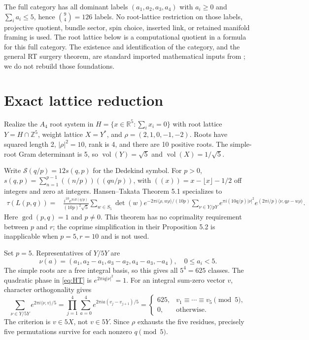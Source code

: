 \documentclass[11pt]{article}
\newcommand{\Z}{\mathbb Z}
\newcommand{\R}{\mathbb R}
\begin{document}
The full category has all dominant labels $(a_1,a_2,a_3,a_4)$ with
$a_i\geq0$ and $\sum_i a_i\leq5$, hence $\binom94=126$ labels. No
root-lattice restriction on those labels, projective quotient, bundle
sector, spin choice, inserted link, or retained manifold framing is used.
The root lattice below is a computational quotient in a formula for
this full category. The existence and identification of the category,
and the general RT surgery theorem, are standard imported mathematical
inputs from \cite{HT}; we do not rebuild those foundations.

\section{Exact lattice reduction}
Realize the $A_4$ root system in $H=\{x\in\R^5:\sum_i x_i=0\}$ with
root lattice $Y=H\cap\Z^5$, weight lattice $X=Y^*$, and
$\rho=(2,1,0,-1,-2)$. Roots have squared length 2,
$|\rho|^2=10$, rank is 4, and there are 10 positive roots.
The simple-root Gram determinant is 5, so $\operatorname{vol}(Y)=\sqrt5$
and $\operatorname{vol}(X)=1/\sqrt5$.

Write $\mathcal S(q/p)=12s(q,p)$ for the Dedekind symbol. For $p>0$,
$s(q,p)=\sum_{n=1}^{p-1}((n/p))((qn/p))$, with
$((x))=x-\lfloor x\rfloor-1/2$ off integers and zero at integers.
Hansen--Takata Theorem 5.1 specializes to
\begin{align}
\tau(L(p,q))={}&\frac{i^{10}e^{\pi i\mathcal S(q/p)}}{(10p)^2\sqrt5}
\sum_{w\in S_5}\det(w)e^{-2\pi i\langle\rho,w\rho\rangle/(10p)}
\sum_{\nu\in Y/pY}e^{\pi i(10q/p)|\nu|^2}
 e^{(2\pi i/p)\langle\nu,q\rho-w\rho\rangle}.
\label{eq:HT}
\end{align}
Here $\gcd(p,q)=1$ and $p\ne0$. This theorem has no coprimality
requirement between $p$ and $r$; the coprime simplification in their
Proposition 5.2 is inapplicable when $p=5,r=10$ and is not used.

Set $p=5$. Representatives of $Y/5Y$ are
\[
\nu(a)=(a_1,a_2-a_1,a_3-a_2,a_4-a_3,-a_4),\quad 0\leq a_i<5.
\]
The simple roots are a free integral basis, so this gives all $5^4=625$
classes. The quadratic phase in \eqref{eq:HT} is
$e^{2\pi iq|\nu|^2}=1$. For an integral sum-zero vector $v$, character
orthogonality gives
\begin{equation}
\sum_{\nu\in Y/5Y}e^{2\pi i\langle\nu,v\rangle/5}
=\prod_{j=1}^4\sum_{a=0}^4 e^{2\pi ia(v_j-v_{j+1})/5}
=\begin{cases}625,&v_1\equiv\cdots\equiv v_5\pmod5,\\0,&\text{otherwise.}\end{cases}
\label{eq:char}
\end{equation}
The criterion is $v\in5X$, not $v\in5Y$. Since $\rho$ exhausts the
five residues, precisely five permutations survive for each nonzero
$q\pmod5$.
\end{document}
